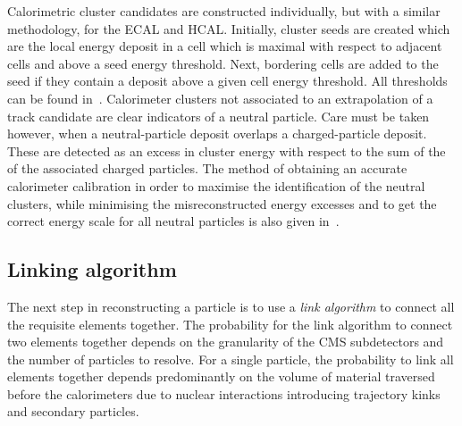 Calorimetric cluster candidates are constructed individually, but with a similar methodology, for the ECAL and HCAL. 
Initially, cluster seeds are created which are the local energy deposit in a cell which is maximal with respect to adjacent cells and above a seed energy threshold.
Next, bordering cells are added to the seed if they contain a deposit above a given cell energy threshold.
All thresholds can be found in~\cite{Event:PFlow}.
Calorimeter clusters not associated to an extrapolation of a track candidate are clear indicators of a neutral particle.
Care must be taken however, when a neutral-particle deposit overlaps a charged-particle deposit.
These are detected as an excess in cluster energy with respect to the sum of the \pt{} of the associated charged particles.
The method of obtaining an accurate calorimeter calibration in order to maximise the identification of the neutral clusters, while minimising the misreconstructed energy excesses and to get the correct energy scale for all neutral particles is also given in~\cite{Event:PFlow}.


\subsection{Linking algorithm} %
\label{sub:linking_algorithm}

The next step in reconstructing a particle is to use a \textit{link algorithm} to connect all the requisite \PF{} elements together.
The probability for the link algorithm to connect two elements together depends on the granularity of the CMS subdetectors and the number of particles to resolve.
For a single particle, the probability to link all elements together depends predominantly on the volume of material traversed before the calorimeters due to nuclear interactions introducing trajectory kinks and secondary particles.

